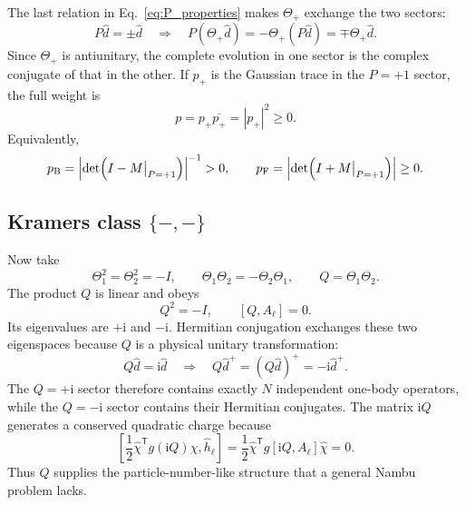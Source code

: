 \documentclass[onecolumn,aps,prb,amsmath,amssymb,superscriptaddress,longbibliography]{revtex4-2}
\newcommand{\ii}{\mathrm{i}}
\newcommand{\trans}{\mathsf{T}}
\begin{document}
The last relation in Eq.~\eqref{eq:P_properties} makes \(\Theta_+\) exchange the two sectors:
\begin{equation}
    P\hat d=\pm\hat d
    \quad\Longrightarrow\quad
    P(\Theta_+\hat d)=-\Theta_+(P\hat d)
    =\mp\Theta_+\hat d.
    \label{eq:P_sector_exchange}
\end{equation}
Since \(\Theta_+\) is antiunitary, the complete evolution in one sector is the complex conjugate of that in the other.  If \(p_+\) is the Gaussian trace in the \(P=+1\) sector, the full weight is~\cite{li2015prb,li2016prl}
\begin{equation}
    p=p_+\overline{p_+}=|p_+|^2\geq0.
    \label{eq:majorana_modulus_square}
\end{equation}
Equivalently,
\begin{equation}
    p_{\rm B}=\left|\det\!\left(I-M\big|_{P=+1}\right)\right|^{-1}>0,
    \qquad
    p_{\rm F}=\left|\det\!\left(I+M\big|_{P=+1}\right)\right|\geq0.
    \label{eq:majorana_determinants}
\end{equation}
\subsection{Kramers class \texorpdfstring{\(\{-,-\}\)}{\{-,-\}}}

Now take
\begin{equation}
    \Theta_1^2=\Theta_2^2=-I,
    \qquad
    \Theta_1\Theta_2=-\Theta_2\Theta_1,
    \qquad
    Q=\Theta_1\Theta_2.
    \label{eq:kramers_class}
\end{equation}
The product \(Q\) is linear and obeys
\begin{equation}
    Q^2=-I,
    \qquad
    [Q,A_\ell]=0.
    \label{eq:Q_properties}
\end{equation}
Its eigenvalues are \(+\ii\) and \(-\ii\).  Hermitian conjugation exchanges these two eigenspaces because \(Q\) is a physical unitary transformation:
\begin{equation}
    Q\hat d=\ii\hat d
    \quad\Longrightarrow\quad
    Q\hat d^+=(Q\hat d)^+=-\ii\hat d^+.
    \label{eq:Q_adjoint_pair}
\end{equation}
The \(Q=+\ii\) sector therefore contains exactly \(N\) independent one-body operators, while the \(Q=-\ii\) sector contains their Hermitian conjugates.  The matrix \(\ii Q\) generates a conserved quadratic charge because
\begin{equation}
    \left[\frac12\hat\chi^\trans g(\ii Q)\hat\chi,
      \hat h_\ell\right]
    =\frac12\hat\chi^\trans g[\ii Q,A_\ell]\hat\chi=0.
    \label{eq:charge_conservation}
\end{equation}
Thus \(Q\) supplies the particle-number-like structure that a general Nambu problem lacks.
\end{document}
